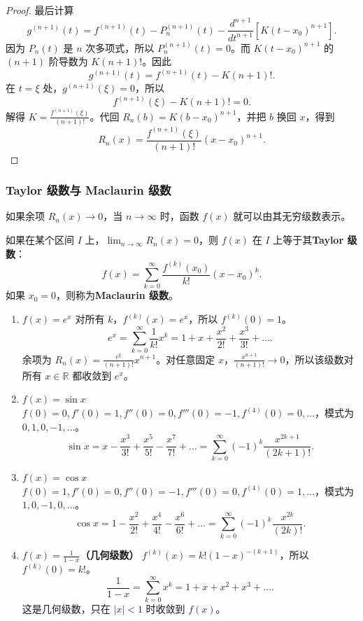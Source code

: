 \begin{proof}
最后计算
\[
g^{(n+1)}(t)=f^{(n+1)}(t)-P_n^{(n+1)}(t)-\frac{d^{n+1}}{dt^{n+1}}[K(t-x_0)^{n+1}].
\]
因为 $P_n(t)$ 是 $n$ 次多项式，所以 $P_n^{(n+1)}(t)=0$。而 $K(t-x_0)^{n+1}$ 的 $(n+1)$ 阶导数为 $K(n+1)!$。因此
\[
g^{(n+1)}(t)=f^{(n+1)}(t)-K(n+1)!.
\]
在 $t=\xi$ 处，$g^{(n+1)}(\xi)=0$，所以
\[
f^{(n+1)}(\xi)-K(n+1)!=0.
\]
解得 $K=\frac{f^{(n+1)}(\xi)}{(n+1)!}$。代回 $R_n(b)=K(b-x_0)^{n+1}$，并把 $b$ 换回 $x$，得到
\[
R_n(x)=\frac{f^{(n+1)}(\xi)}{(n+1)!}(x-x_0)^{n+1}.
\]
\end{proof}

\subsubsection{Taylor 级数与 Maclaurin 级数}
如果余项 $R_n(x)\to 0$，当 $n\to\infty$ 时，函数 $f(x)$ 就可以由其无穷级数表示。

\begin{definition}[Taylor 级数]
如果在某个区间 $I$ 上，$\lim_{n\to \infty}R_n(x)=0$，则 $f(x)$ 在 $I$ 上等于其\textbf{Taylor 级数}：
\[
f(x)=\sum_{k=0}^{\infty}\frac{f^{(k)}(x_0)}{k!}(x-x_0)^k.
\]
如果 $x_0=0$，则称为\textbf{Maclaurin 级数}。
\end{definition}

\begin{example}[常见 Maclaurin 级数]
\begin{enumerate}
    \item \textbf{$f(x)=e^x$}
    对所有 $k$，$f^{(k)}(x)=e^x$，所以 $f^{(k)}(0)=1$。
    \[
    e^x=\sum_{k=0}^{\infty}\frac{1}{k!}x^k=1+x+\frac{x^2}{2!}+\frac{x^3}{3!}+\dots.
    \]
    余项为 $R_n(x)=\frac{e^\xi}{(n+1)!}x^{n+1}$。对任意固定 $x$，$\frac{x^{n+1}}{(n+1)!}\to 0$，所以该级数对所有 $x\in\mathbb{R}$ 都收敛到 $e^x$。

    \item \textbf{$f(x)=\sin x$}
    $f(0)=0,f'(0)=1,f''(0)=0,f'''(0)=-1,f^{(4)}(0)=0,\dots$，模式为 $0,1,0,-1,\dots$。
    \[
    \sin x=x-\frac{x^3}{3!}+\frac{x^5}{5!}-\frac{x^7}{7!}+\dots=\sum_{k=0}^{\infty}(-1)^k\frac{x^{2k+1}}{(2k+1)!}.
    \]

    \item \textbf{$f(x)=\cos x$}
    $f(0)=1,f'(0)=0,f''(0)=-1,f'''(0)=0,f^{(4)}(0)=1,\dots$，模式为 $1,0,-1,0,\dots$。
    \[
    \cos x=1-\frac{x^2}{2!}+\frac{x^4}{4!}-\frac{x^6}{6!}+\dots=\sum_{k=0}^{\infty}(-1)^k\frac{x^{2k}}{(2k)!}.
    \]
    \item \textbf{$f(x)=\frac{1}{1-x}$（几何级数）}
    $f^{(k)}(x)=k!(1-x)^{-(k+1)}$，所以 $f^{(k)}(0)=k!$。
    \[
    \frac{1}{1-x}=\sum_{k=0}^{\infty}x^k=1+x+x^2+x^3+\dots.
    \]
    这是几何级数，只在 $|x|<1$ 时收敛到 $f(x)$。
\end{enumerate}
\end{example}

